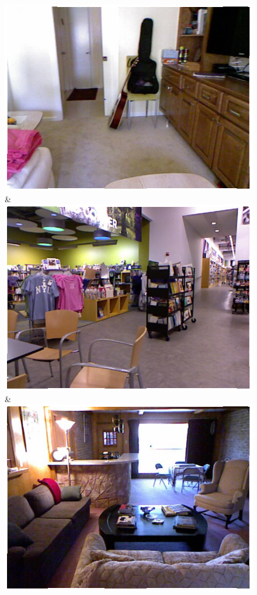 \documentclass[a4paper, 10pt, conference]{ieeeconf}      %
\begin{document}
\begin{figure}
\begin{tabu}
    \includegraphics[width=\linewidth]{images/01331_image.png}&%
    \includegraphics[width=\linewidth]{images/00118_image.png}&%
    \includegraphics[width=\linewidth]{images/01203_image.png}\\
    \\



\end{tabu}
\end{figure}
\end{document}
